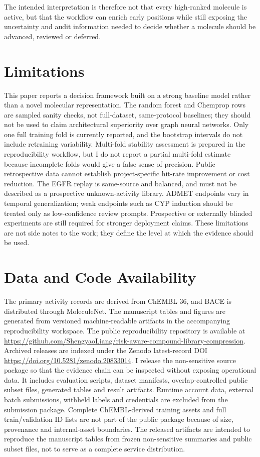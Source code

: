 \documentclass[manuscript=article]{achemso}
\begin{document}
The intended interpretation is therefore not that every high-ranked molecule is
active, but that the workflow can enrich early positions while still exposing
the uncertainty and audit information needed to decide whether a molecule
should be advanced, reviewed or deferred.

\section{Limitations}
This paper reports a decision framework built on a strong baseline model
rather than a novel molecular representation. The random forest and Chemprop
rows are sampled sanity checks, not full-dataset, same-protocol baselines; they
should not be used to claim architectural superiority over graph neural
networks. Only one full training fold is currently reported, and the bootstrap
intervals do not include retraining variability. Multi-fold stability
assessment is prepared in the reproducibility workflow, but I do not report a
partial multi-fold estimate because incomplete folds would give a false sense
of precision. Public retrospective data cannot establish project-specific
hit-rate improvement or cost reduction. The EGFR replay is same-source and
balanced, and must not be described as a prospective unknown-activity library.
ADMET endpoints vary in temporal generalization; weak endpoints such as CYP
induction should be treated only as low-confidence review prompts. Prospective
or externally blinded experiments are still required for stronger deployment
claims. These limitations are not side notes to the work; they define the
level at which the evidence should be used.

\section{Data and Code Availability}
The primary activity records are derived from ChEMBL 36, and BACE is
distributed through MoleculeNet. The manuscript tables and figures are
generated from versioned machine-readable artifacts in the accompanying
reproducibility workspace. The public reproducibility repository is available
at \url{https://github.com/ShengyaoLiang/risk-aware-compound-library-compression}.
Archived releases are indexed under the Zenodo latest-record DOI
\url{https://doi.org/10.5281/zenodo.20833014}.
I release the non-sensitive source package so that the evidence chain can be
inspected without exposing operational data. It includes evaluation scripts,
dataset manifests, overlap-controlled public subset files, generated tables
and result artifacts. Runtime account data, external batch submissions,
withheld labels and credentials are excluded from the submission package.
Complete ChEMBL-derived training assets and full train/validation ID lists are
not part of the public package because of size, provenance and internal-asset
boundaries. The released artifacts are intended to reproduce the manuscript
tables from frozen non-sensitive summaries and public subset files, not to
serve as a complete service distribution.
\end{document}
